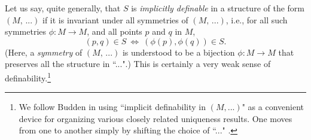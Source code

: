 \documentclass [12] {article}
\theoremstyle{plain}
\numberwithin{figure}{subsection}
\numberwithin{proposition}{subsection}
\begin{document}
Let us say, quite generally,  that  $S$ is \emph{implicitly definable} in a structure of the form $(M, \,  ...)$ if it is invariant under all symmetries of  $(M, \,  ... )$, i.e., for all such symmetries $\phi:M \rightarrow M$, and all points $p$ and $q$ in $M$,
\begin{equation} \label{implicit definability}
(p, q) \in  S  \ \Longleftrightarrow  \  (\phi(p), \phi(q))\in  S.
\end{equation}
(Here, a \emph{symmetry} of $(M, \,  ... )$ is understood to be a bijection $\phi:M \rightarrow M$ that preserves all the structure in ``...".) 
This is certainly a very weak sense of definability.\footnote{We follow Budden  in using  ``implicit definability in $(M, ... )$"  as a convenient device for organizing various closely related  uniqueness results. One moves from one to another simply by shifting the choice  of ``..." . }
\end{document}

